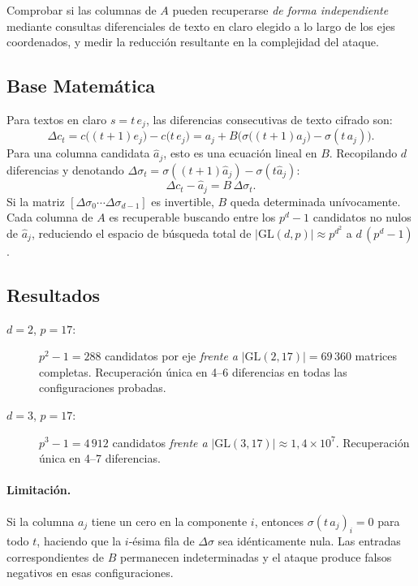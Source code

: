 \documentclass[12pt,a4paper]{article}
\theoremstyle{definition}
\newcommand{\GL}{\mathrm{GL}}
\begin{document}
Comprobar si las columnas de $A$ pueden recuperarse \emph{de forma
independiente} mediante consultas diferenciales de texto en claro
elegido a lo largo de los ejes coordenados, y medir la reducción
resultante en la complejidad del ataque.

\subsection{Base Matemática}

Para textos en claro $s = t\,e_j$, las diferencias consecutivas de
texto cifrado son:
\begin{equation}\label{eq:diferencia}
  \Delta c_t = c\bigl((t+1)e_j\bigr) - c\bigl(t\,e_j\bigr)
  = a_j + B\bigl(\sigma\bigl((t+1)a_j\bigr) - \sigma(t\,a_j)\bigr).
\end{equation}
Para una columna candidata $\hat{a}_j$, esto es una ecuación lineal
en $B$. Recopilando $d$ diferencias y denotando
$\Delta\sigma_t = \sigma((t+1)\hat{a}_j) - \sigma(t\hat{a}_j)$:
\begin{equation}
  \Delta c_t - \hat{a}_j = B\,\Delta\sigma_t.
\end{equation}
Si la matriz $[\Delta\sigma_0 \cdots \Delta\sigma_{d-1}]$ es
invertible, $B$ queda determinada unívocamente.
Cada columna de $A$ es recuperable buscando entre los $p^d - 1$
candidatos no nulos de $\hat{a}_j$, reduciendo el espacio de
búsqueda total de $|\GL(d,p)| \approx p^{d^2}$ a $d\,(p^d - 1)$.

\subsection{Resultados}

\begin{description}
  \item[$d = 2$, $p = 17$:] $p^2 - 1 = 288$ candidatos por eje
    \emph{frente a} $|\GL(2,17)| = 69\,360$ matrices completas.
    Recuperación única en 4--6 diferencias en todas las
    configuraciones probadas.
  \item[$d = 3$, $p = 17$:] $p^3 - 1 = 4\,912$ candidatos
    \emph{frente a} $|\GL(3,17)| \approx 1{,}4\times 10^7$.
    Recuperación única en 4--7 diferencias.
\end{description}

\paragraph{Limitación.} Si la columna $a_j$ tiene un cero en la
componente $i$, entonces $\sigma(t\,a_j)_i = 0$ para todo $t$,
haciendo que la $i$-ésima fila de $\Delta\sigma$ sea idénticamente
nula. Las entradas correspondientes de $B$ permanecen indeterminadas
y el ataque produce falsos negativos en esas configuraciones.
\end{document}

